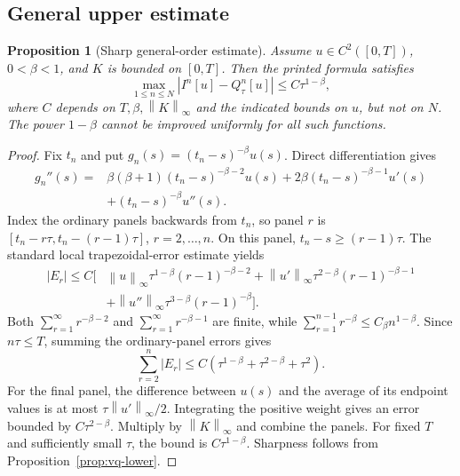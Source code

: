 \documentclass[11pt]{amsart}
\numberwithin{equation}{section}
\newtheorem{proposition}{Proposition}[section]
\theoremstyle{remark}
\newcommand{\norm}[1]{\left\lVert #1\right\rVert}
\newcommand{\abs}[1]{\left\lvert #1\right\rvert}
\begin{document}
\subsection{General upper estimate}
\begin{proposition}[Sharp general-order estimate]\label{prop:vq-upper}
Assume $u\in C^2([0,T])$, $0<\beta<1$, and $K$ is bounded on
$[0,T]$. Then the printed formula satisfies
\[
\max_{1\leq n\leq N}\abs{I^n[u]-Q_\tau^n[u]}\leq C\tau^{1-\beta},
\]
where $C$ depends on $T,\beta,\norm{K}_\infty$ and the indicated
bounds on $u$, but not on $N$. The power $1-\beta$ cannot be improved
uniformly for all such functions.
\end{proposition}
\begin{proof}
Fix $t_n$ and put $g_n(s)=(t_n-s)^{-\beta}u(s)$. Direct differentiation gives
\begin{equation}\label{eq:vq-gpp}
\begin{split}
g_n''(s)={}&\beta(\beta+1)(t_n-s)^{-\beta-2}u(s)
 +2\beta(t_n-s)^{-\beta-1}u'(s)\\
&+(t_n-s)^{-\beta}u''(s).
\end{split}
\end{equation}
Index the ordinary panels backwards from $t_n$, so panel $r$ is
$[t_n-r\tau,t_n-(r-1)\tau]$, $r=2,\ldots,n$. On this panel,
$t_n-s\geq(r-1)\tau$. The standard local trapezoidal-error estimate yields
\[
\begin{split}
\abs{E_r}\leq C\bigl[&\norm{u}_\infty\tau^{1-\beta}(r-1)^{-\beta-2}
 +\norm{u'}_\infty\tau^{2-\beta}(r-1)^{-\beta-1}\\
&+\norm{u''}_\infty\tau^{3-\beta}(r-1)^{-\beta}\bigr].
\end{split}
\]
Both $\sum_{r=1}^{\infty}r^{-\beta-2}$ and
$\sum_{r=1}^{\infty}r^{-\beta-1}$ are finite, while
$\sum_{r=1}^{n-1}r^{-\beta}\leq C_\beta n^{1-\beta}$. Since $n\tau\leq T$,
summing the ordinary-panel errors gives
\[
\sum_{r=2}^n\abs{E_r}\leq C(\tau^{1-\beta}+\tau^{2-\beta}+\tau^2).
\]
For the final panel, the difference between $u(s)$ and the average of its
endpoint values is at most $\tau\norm{u'}_\infty/2$. Integrating the positive
weight gives an error bounded by $C\tau^{2-\beta}$. Multiply by
$\norm{K}_\infty$ and combine the panels. For fixed $T$ and
sufficiently small $\tau$, the bound is $C\tau^{1-\beta}$. Sharpness follows
from Proposition~\ref{prop:vq-lower}.
\end{proof}
\end{document}
